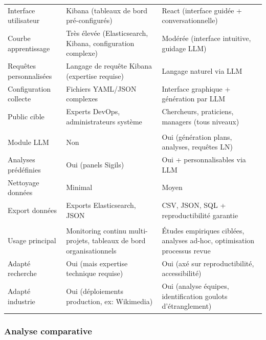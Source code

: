 \begin{tabularx}{\textwidth}{|l|X|X|}
\rowcolor{gray!25}
\multicolumn{3}{|l|}{\textbf{INTERFACE \& UTILISABILITÉ}} \\
\hline
Interface utilisateur & Kibana (tableaux de bord pré-configurés) & React (interface guidée + conversationnelle) \\
\hline
Courbe apprentissage & Très élevée (Elasticsearch, Kibana, configuration complexe) & Modérée (interface intuitive, guidage LLM) \\
\hline
Requêtes personnalisées & Langage de requête Kibana (expertise requise) & Langage naturel via LLM \\
\hline
Configuration collecte & Fichiers YAML/JSON complexes & Interface graphique + génération par LLM \\
\hline
Public cible & Experts DevOps, administrateurs système & Chercheurs, praticiens, managers (tous niveaux) \\
\hline

\rowcolor{gray!25}
\multicolumn{3}{|l|}{\textbf{ANALYSE \& EXPLORATION}} \\
\hline
Module LLM & Non & Oui (génération plans, analyses, requêtes LN) \\
\hline
Analyses prédéfinies & Oui (panels Sigils) & Oui + personnalisables via LLM \\
\hline
Nettoyage données & Minimal & Moyen \\
\hline
Export données & Exports Elasticsearch, JSON & CSV, JSON, SQL + reproductibilité garantie \\
\hline

\rowcolor{gray!25}
\multicolumn{3}{|l|}{\textbf{CAS D'USAGE}} \\
\hline
Usage principal & Monitoring continu multi-projets, tableaux de bord organisationnels & Études empiriques ciblées, analyses ad-hoc, optimisation processus revue \\
\hline
Adapté recherche & Oui (mais expertise technique requise) & Oui (axé sur reproductibilité, accessibilité) \\
\hline
Adapté industrie & Oui (déploiements production, ex: Wikimedia) & Oui (analyse équipes, identification goulots d'étranglement) \\

\end{tabularx}
\subsubsection{Analyse comparative}

